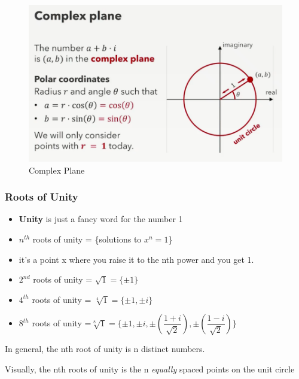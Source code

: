 \documentclass[12pt]{article}
\begin{document}
\begin{figure}[H]
    \centering
    \includegraphics[scale=0.3]{images/complex-plane.png}
    \caption{Complex Plane}
\end{figure}

\subsubsection*{Roots of Unity}
\begin{itemize}
    \item \textbf{Unity} is just a fancy word for the number 1
    \item $n^{th}$  roots of unity = \{solutions to $x^n = 1$\}
    \item it's a point x where you raise it to the nth power and you get 1.
\end{itemize}

\begin{example}
    \begin{itemize}
        \item $2^{nd}$ roots of unity = $\sqrt{1} = \{\pm 1\}$
        \item $4^{th}$ roots of unity = $\sqrt[4]{1} = \{\pm 1, \pm i\}$
        \item $8^{th}$ roots of unity =$\sqrt[8]{1} = \{\pm 1, \pm i, \pm \left(\dfrac{1 + i}{\sqrt{2}}\right), \pm \left(\dfrac{1 - i}{\sqrt{2}}\right)\}$
    \end{itemize}

    In general, the nth root of unity is n distinct numbers.
\end{example}
Visually, the {\color{red} nth} roots of unity is the {\color{red} n} \emph{equally} spaced points on the unit circle
\end{document}
